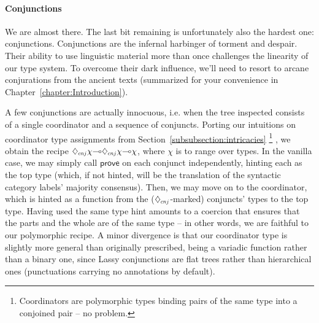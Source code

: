 \paragraph{Conjunctions}
We are almost there.
The last bit remaining is unfortunately also the hardest one: conjunctions.
Conjunctions are the infernal harbinger of torment and despair.
Their ability to use linguistic material more than once challenges the linearity of our type system.
To overcome their dark influence, we'll need to resort to arcane conjurations from the ancient texts (summarized for your convenience in Chapter~\ref{chapter:Introduction}).

A few conjunctions are actually innocuous, i.e. when the tree inspected consists of a single coordinator and a sequence of conjuncts.
Porting our intuitions on coordinator type assignments from Section~\ref{subsubsection:intricacies}%
	\footnote{Coordinators are polymorphic types binding pairs of the same type into a conjoined pair -- no problem.}%
, we obtain the recipe $\ddia{cnj}\chi\li\ddia{cnj}\chi\li\chi$, where $\chi$ is to range over types.
In the vanilla case, we may simply call $\mathsf{prove}$ on each conjunct independently, hinting each as the top type (which, if not hinted, will be the translation of the syntactic category labels' majority consensus).
Then, we may move on to the coordinator, which is hinted as a function from the ($\ddia{cnj}$-marked) conjuncts' types to the top type.
Having used the same type hint amounts to a coercion that ensures that the parts and the whole are of the same type -- in other words, we are faithful to our polymorphic recipe.
A minor divergence is that our coordinator type is slightly more general than originally prescribed, being a variadic function rather than a binary one, since Lassy conjunctions are flat trees rather than hierarchical ones (punctuations carrying no annotations by default).

